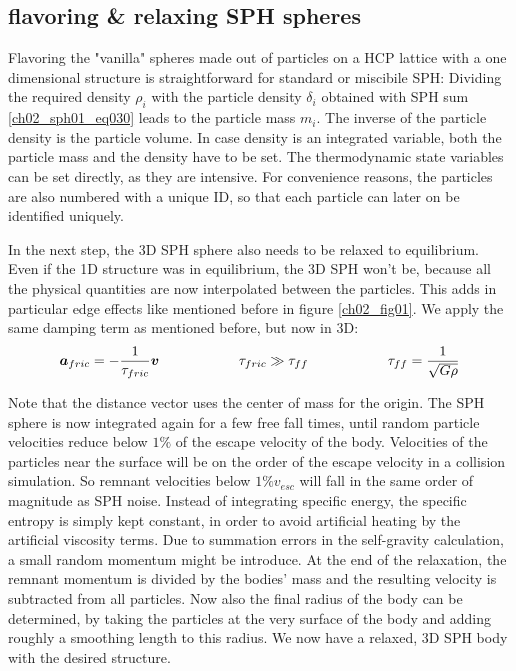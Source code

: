 \subsection{flavoring \& relaxing SPH spheres}
\label{ch02_sec04_ss03}
Flavoring the "vanilla" spheres made out of particles on a HCP lattice with a one dimensional structure is straightforward for standard or miscibile SPH: Dividing the required density $\rho_i$ with the particle density $\delta_i$ obtained with SPH sum \ref{ch02_sph01_eq030} leads to the particle mass $m_i$. The inverse of the particle density is the particle volume. In case density is an integrated variable, both the particle mass and the density have to be set. The thermodynamic state variables can be set directly, as they are intensive. For convenience reasons, the particles are also numbered with a unique ID, so that each particle can later on be identified uniquely.

In the next step, the 3D SPH sphere also needs to be relaxed to equilibrium. Even if the 1D structure was in equilibrium, the 3D SPH won't be, because all the physical quantities are now interpolated between the particles. This adds in particular edge effects like mentioned before in figure \ref{ch02_fig01}. We apply the same damping term as mentioned before, but now in 3D:
\begin{equation}
\label{ch02_aux_eq002}
\boldsymbol{a}_{fric} = - \frac{1}{\tau_{fric}} \boldsymbol{v} \hspace{2.0cm} \tau_{fric} \gg \tau_{ff}\hspace{2.0cm} \tau_{ff} = \frac{1}{\sqrt{G \rho} }
\end{equation}

Note that the distance vector uses the center of mass for the origin. The SPH sphere is now integrated again for a few free fall times, until random particle velocities reduce below $1\%$ of the escape velocity of the body. Velocities of the particles near the surface will be on the order of the escape velocity in a collision simulation. So remnant velocities below $1\% v_{esc}$ will fall in the same order of magnitude as SPH noise. Instead of integrating specific energy, the specific entropy is simply kept constant, in order to avoid artificial heating by the artificial viscosity terms. Due to summation errors in the self-gravity calculation, a small random momentum might be introduce. At the end of the relaxation, the remnant momentum is divided by the bodies' mass and the resulting velocity is subtracted from all particles. Now also the final radius of the body can be determined, by taking the particles at the very surface of the body and adding roughly a smoothing length to this radius. We now have a relaxed, 3D SPH body with the desired structure.

